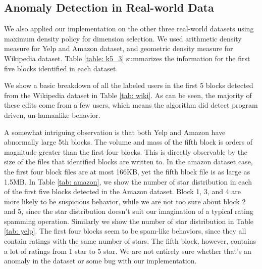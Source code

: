 \subsection{Anomaly Detection in Real-world Data}
We also applied our implementation on the other three real-world datasets using maximum density policy for dimension selection. We used arithmetic density measure for Yelp and Amazon dataset, and geometric density measure for Wikipedia dataset. Table \ref{table: k5_3} summarizes the information for the first five blocks identified in each dataset. 

We show a basic breakdown of all the labeled users in the first 5 blocks detected from the Wikipedia dataset in Table \ref{tab: wiki}. As can be seen, the majority of these edits come from a few users, which means the algorithm did detect program driven, un-humanlike behavior.

A somewhat intriguing observation is that both Yelp and Amazon have abnormally large 5th blocks. The volume and mass of the fifth block is orders of magnitude greater than the first four blocks. This is directly observable by the size of the files that identified blocks are written to. In the amazon dataset case, the first four block files are at most 166KB, yet the fifth block file is as large as 1.5MB.  In Table \ref{tab: amazon}, we show the number of star distribution in each of the first five blocks detected in the Amazon dataset. Block 1, 3, and 4 are more likely to be suspicious behavior, while we are not too sure about block 2 and 5, since the star distribution doesn't suit our imagination of a typical rating spamming operation. Similarly we show the number of star distribution in Table \ref{tab: yelp}. The first four blocks seem to be spam-like behaviors, since they all contain ratings with the same number of stars. The fifth block, however, contains a lot of ratings from 1 star to 5 star. We are not entirely sure whether that's an anomaly in the dataset or some bug with our implementation.

